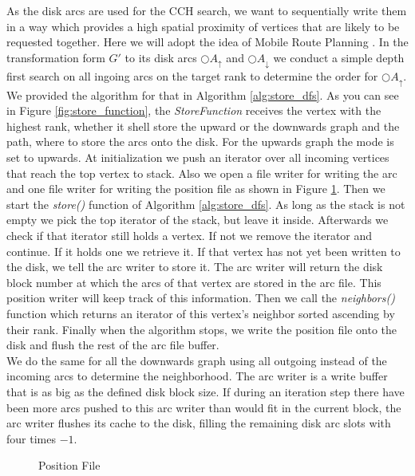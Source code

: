 As the disk arcs are used for the CCH search, we want to sequentially write them in a way which provides a high spatial proximity of vertices that are likely to be requested together.
Here we will adopt the idea of Mobile Route Planning \cite{Sanders}.
In the transformation form $G'$ to its disk arcs $\bigcirc A_\uparrow$ and $\bigcirc A_\downarrow$ we conduct a simple depth first search on all ingoing arcs on the target rank to determine the order for $\bigcirc A_\uparrow$.
We provided the algorithm for that in Algorithm \ref{alg:store_dfs}.
As you can see in Figure \ref{fig:store_function}, the \textit{StoreFunction} receives the vertex with the highest rank, whether it shell store the upward or the downwards graph and the path, where to store the arcs onto the disk.
For the upwards graph the mode is set to upwards.
At initialization we push an iterator over all incoming vertices that reach the top vertex to stack.
Also we open a file writer for writing the arc and one file writer for writing the position file as shown in Figure \ref{fig:position_file}.
Then we start the \textit{store()} function of Algorithm \ref{alg:store_dfs}.
As long as the stack is not empty we pick the top iterator of the stack, but leave it inside.
Afterwards we check if that iterator still holds a vertex.
If not we remove the iterator and continue.
If it holds one we retrieve it.
If that vertex has not yet been written to the disk, we tell the arc writer to store it.
The arc writer will return the disk block number at which the arcs of that vertex are stored in the arc file.
This position writer will keep track of this information.
Then we call the \textit{neighbors()} function which returns an iterator of this vertex's neighbor sorted ascending by their rank.
Finally when the algorithm stops, we write the position file onto the disk and flush the rest of the arc file buffer.
\\
We do the same for all the downwards graph using all outgoing instead of the incoming arcs to determine the neighborhood.
The arc writer is a write buffer that is as big as the defined disk block size.
If during an iteration step there have been more arcs pushed to this arc writer than would fit in the current block, the arc writer flushes its cache to the disk, filling the remaining disk arc slots with four times $-1$.

\begin{figure}
    \centering
    
    \caption{Position File}
    \label{fig:position_file}
\end{figure}

